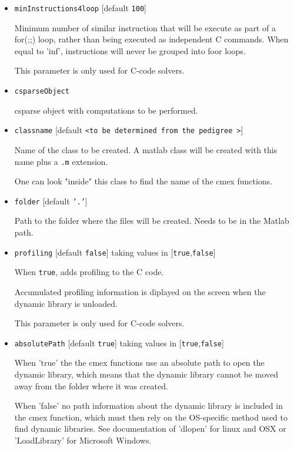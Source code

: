 \documentclass[11pt]{article}
\begin{document}
\begin{itemize}
\item \texttt{minInstructions4loop} [default \texttt{100}]

   Minimum number of similar instruction that will be execute as part of a   
for(;;) loop, rather than being executed as independent C commands.   
When equal to 'inf', instructions will never be grouped into foor loops.   
    
This parameter is only used for C-code solvers.

\item \texttt{csparseObject}

   csparse object with computations to be performed.

\item \texttt{classname} [default \texttt{<to be determined from the pedigree >}]

   Name of the class to be created.   
A matlab class will be created with this name plus a \texttt{.m} extension.   
    
One can look "inside" this class to find the name of the cmex functions.

\item \texttt{folder} [default \texttt{'.'}]

   Path to the folder where the files will be created.   
Needs to be in the Matlab path.

\item \texttt{profiling} [default \texttt{false}] taking values in [\texttt{true},\texttt{false}]

   When \texttt{true}, adds profiling to the C code.   
    
Accumulated profiling information is diplayed on the screen when the   
dynamic library is unloaded.   
    
This parameter is only used for C-code solvers.

\item \texttt{absolutePath} [default \texttt{true}] taking values in [\texttt{true},\texttt{false}]

   When 'true' the the cmex functions use an absolute path to open   
the dynamic library, which means that the dynamic library cannot   
be moved away from the folder where it was created.   
    
When 'false' no path information about the dynamic library is   
included in the cmex function, which must then rely on the OS-specific   
method used to find dynamic libraries. See documentation of 'dlopen'   
for linux and OSX or 'LoadLibrary' for Microsoft Windows.   
    

\end{itemize}
\end{document}
